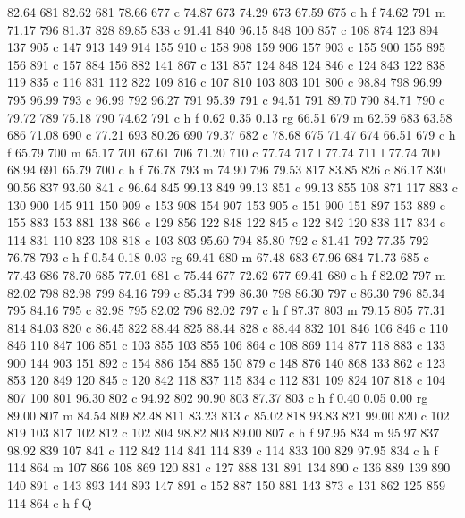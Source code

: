 {{        82.64 681 82.62 681 78.66 677 c
        74.87 673 74.29 673 67.59 675 c
        h f
        74.62 791 m
        71.17 796 81.37 828 89.85 838 c
        91.41 840 96.15 848 100 857 c
        108 874 123 894 137 905 c
        147 913 149 914 155 910 c
        158 908 159 906 157 903 c
        155 900 155 895 156 891 c
        157 884 156 882 141 867 c
        131 857 124 848 124 846 c
        124 843 122 838 119 835 c
        116 831 112 822 109 816 c
        107 810 103 803 101 800 c
        98.84 798 96.99 795 96.99 793 c
        96.99 792 96.27 791 95.39 791 c
        94.51 791 89.70 790 84.71 790 c
        79.72 789 75.18 790 74.62 791 c
        h f
        0.62 0.35 0.13 rg
        66.51 679 m
        62.59 683 63.58 686 71.08 690 c
        77.21 693 80.26 690 79.37 682 c
        78.68 675 71.47 674 66.51 679 c
        h f
        65.79 700 m
        65.17 701 67.61 706 71.20 710 c
        77.74 717 l
        77.74 711 l
        77.74 700 68.94 691 65.79 700 c
        h f
        76.78 793 m
        74.90 796 79.53 817 83.85 826 c
        86.17 830 90.56 837 93.60 841 c
        96.64 845 99.13 849 99.13 851 c
        99.13 855 108 871 117 883 c
        130 900 145 911 150 909 c
        153 908 154 907 153 905 c
        151 900 151 897 153 889 c
        155 883 153 881 138 866 c
        129 856 122 848 122 845 c
        122 842 120 838 117 834 c
        114 831 110 823 108 818 c
        103 803 95.60 794 85.80 792 c
        81.41 792 77.35 792 76.78 793 c
        h f
        0.54 0.18 0.03 rg
        69.41 680 m
        67.48 683 67.96 684 71.73 685 c
        77.43 686 78.70 685 77.01 681 c
        75.44 677 72.62 677 69.41 680 c
        h f
        82.02 797 m
        82.02 798 82.98 799 84.16 799 c
        85.34 799 86.30 798 86.30 797 c
        86.30 796 85.34 795 84.16 795 c
        82.98 795 82.02 796 82.02 797 c
        h f
        87.37 803 m
        79.15 805 77.31 814 84.03 820 c
        86.45 822 88.44 825 88.44 828 c
        88.44 832 101 846 106 846 c
        110 846 110 847 106 851 c
        103 855 103 855 106 864 c
        108 869 114 877 118 883 c
        133 900 144 903 151 892 c
        154 886 154 885 150 879 c
        148 876 140 868 133 862 c
        123 853 120 849 120 845 c
        120 842 118 837 115 834 c
        112 831 109 824 107 818 c
        104 807 100 801 96.30 802 c
        94.92 802 90.90 803 87.37 803 c
        h f
        0.40 0.05 0.00 rg
        89.00 807 m
        84.54 809 82.48 811 83.23 813 c
        85.02 818 93.83 821 99.00 820 c
        102 819 103 817 102 812 c
        102 804 98.82 803 89.00 807 c
        h f
        97.95 834 m
        95.97 837 98.92 839 107 841 c
        112 842 114 841 114 839 c
        114 833 100 829 97.95 834 c
        h f
        114 864 m
        107 866 108 869 120 881 c
        127 888 131 891 134 890 c
        136 889 139 890 140 891 c
        143 893 144 893 147 891 c
        152 887 150 881 143 873 c
        131 862 125 859 114 864 c
        h f
        Q
    }}

